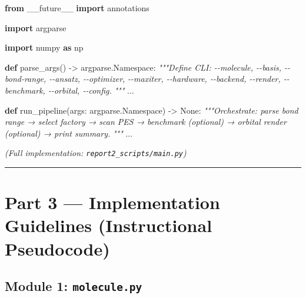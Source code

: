 \documentclass[
  11pt,
]{report}
\newenvironment{Shaded}{}{}
\newcommand{\CommentTok}[1]{\textcolor[rgb]{0.38,0.63,0.69}{\textit{#1}}}
\newcommand{\ImportTok}[1]{\textcolor[rgb]{0.00,0.50,0.00}{\textbf{#1}}}
\newcommand{\KeywordTok}[1]{\textcolor[rgb]{0.00,0.44,0.13}{\textbf{#1}}}
\newcommand{\NormalTok}[1]{#1}
\newcommand{\OperatorTok}[1]{\textcolor[rgb]{0.40,0.40,0.40}{#1}}
\newcommand{\VariableTok}[1]{\textcolor[rgb]{0.10,0.09,0.49}{#1}}
\begin{document}
\begin{Shaded}
\begin{Highlighting}[]
\ImportTok{from}\NormalTok{ \_\_future\_\_ }\ImportTok{import}\NormalTok{ annotations}

\ImportTok{import}\NormalTok{ argparse}

\ImportTok{import}\NormalTok{ numpy }\ImportTok{as}\NormalTok{ np}


\KeywordTok{def}\NormalTok{ parse\_args() }\OperatorTok{{-}\textgreater{}}\NormalTok{ argparse.Namespace:}
    \CommentTok{"""Define CLI: {-}{-}molecule, {-}{-}basis, {-}{-}bond{-}range, {-}{-}ansatz, {-}{-}optimizer,}
\CommentTok{    {-}{-}maxiter, {-}{-}hardware, {-}{-}backend, {-}{-}render, {-}{-}benchmark, {-}{-}orbital, {-}{-}config.}
\CommentTok{    """}
\NormalTok{    ...}


\KeywordTok{def}\NormalTok{ run\_pipeline(args: argparse.Namespace) }\OperatorTok{{-}\textgreater{}} \VariableTok{None}\NormalTok{:}
    \CommentTok{"""Orchestrate: parse bond range → select factory → scan PES →}
\CommentTok{    benchmark (optional) → orbital render (optional) → print summary.}
\CommentTok{    """}
\NormalTok{    ...}
\end{Highlighting}
\end{Shaded}

\emph{(Full implementation: \texttt{report2\_scripts/main.py})}

\begin{center}\rule{0.5\linewidth}{0.5pt}\end{center}

\section{Part 3 --- Implementation Guidelines (Instructional
Pseudocode)}\label{part-3-implementation-guidelines-instructional-pseudocode}

\subsection{\texorpdfstring{Module 1:
\texttt{molecule.py}}{Module 1: molecule.py}}\label{module-1-molecule.py}
\end{document}

